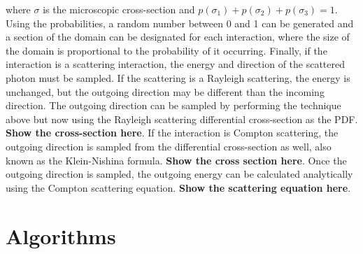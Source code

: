 \documentclass[10pt]{article}
\begin{document}
\noindent where $\sigma$ is the microscopic cross-section and $p(\sigma_1) + p(\sigma_2) + p(\sigma_3) = 1$. Using the probabilities, a random number between 0 and 1 can be generated and a section of the domain can be designated for each interaction, where the size of the domain is proportional to the probability of it occurring. Finally, if the interaction is a scattering interaction, the energy and direction of the scattered photon must be sampled. If the scattering is a Rayleigh scattering, the energy is unchanged, but the outgoing direction may be different than the incoming direction. The outgoing direction can be sampled by performing the technique above but now using the Rayleigh scattering differential cross-section as the PDF. \textbf{Show the cross-section here}. If the interaction is Compton scattering, the outgoing direction is sampled from the differential cross-section as well, also known as the Klein-Nishina formula. \textbf{Show the cross section here}. Once the outgoing direction is sampled, the outgoing energy can be calculated analytically using the Compton scattering equation. \textbf{Show the scattering equation here}. 






\section{Algorithms}
\end{document}
